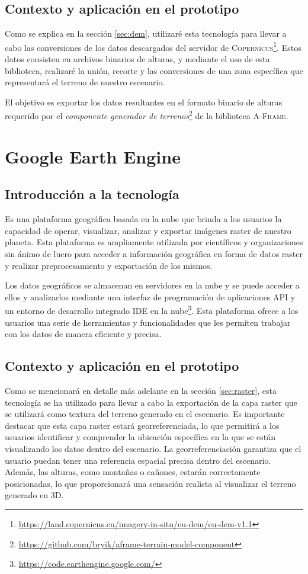 \documentclass[a4paper, 11pt]{book}
\begin{document}
\subsection{Contexto y aplicación en el prototipo}
Como se explica en la sección \ref{sec:dem}, utilizaré esta tecnología para llevar a cabo las conversiones de los datos descargados del servidor de \textsc{Copernicus}\footnote{\url{https://land.copernicus.eu/imagery-in-situ/eu-dem/eu-dem-v1.1}}. Estos datos consisten en archivos binarios de alturas, y mediante el uso de esta biblioteca, realizaré la unión, recorte y las conversiones de una zona específica que representará el terreno de nuestro escenario.

El objetivo es exportar los datos resultantes en el formato binario de alturas requerido por el \emph{componente generador de terrenos}\footnote{\url{https://github.com/bryik/aframe-terrain-model-component}} de la biblioteca \textsc{A-Frame}.
\section{Google Earth Engine}
\subsection{Introducción a la tecnología}
Es una plataforma geográfica basada en la nube que brinda a los usuarios la capacidad de operar, visualizar, analizar y exportar imágenes \gls{raster} de nuestro planeta. Esta plataforma es ampliamente utilizada por científicos y organizaciones sin ánimo de lucro para acceder a información geográfica en forma de datos raster y realizar preprocesamiento y exportación de los mismos.

Los datos geográficos se almacenan en servidores en la nube y se puede acceder a ellos y analizarlos mediante una interfaz de programación de aplicaciones \textsc{API} y un entorno de desarrollo integrado \textsc{IDE} en la nube\footnote{\url{https://code.earthengine.google.com/}}. 
Esta plataforma ofrece a los usuarios una serie de herramientas y funcionalidades que les permiten trabajar con los datos de manera eficiente y precisa.
\subsection{Contexto y aplicación en el prototipo}
Como se mencionará en detalle más adelante en la sección \ref{sec:raster}, esta tecnología se ha utilizado para llevar a cabo la exportación de la capa raster que se utilizará como textura del terreno generado en el escenario. Es importante destacar que esta capa raster estará georreferenciada, lo que permitirá a los usuarios identificar y comprender la ubicación específica en la que se están visualizando los datos dentro del escenario.
La georreferenciación garantiza que el usuario puedan tener una referencia espacial precisa dentro del escenario. Además, las alturas, como montañas o cañones, estarán correctamente posicionadas, lo que proporcionará una sensación realista al visualizar el terreno generado en \textsc{3D}.
\end{document}
